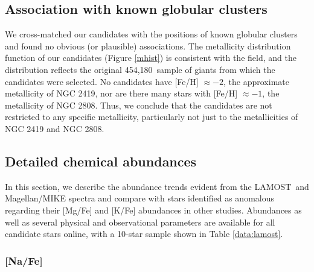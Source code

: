 \documentclass[a4paper,fleqn,usenatbib]{mnras}
\newcommand{\LamostGiants}{454,180}
\newcommand{\project}[1]{#1}
\newcommand{\lamost}{\project{LAMOST}}
\begin{document}
\subsection{Association with known globular clusters}
\label{sec:globclustasoc}
We cross-matched our candidates with the positions of known globular clusters \citep{harris1996} and found no obvious (or plausible) associations. The metallicity distribution function of our candidates (Figure \ref{mhist}) is consistent with the field, and the distribution reflects the original \LamostGiants\ sample of giants from which the candidates were selected.
No candidates have [Fe/H] $\approx -2$, the approximate metallicity of NGC 2419, nor are there many stars with [Fe/H] $\approx -1$, the metallicity of NGC 2808. Thus, we conclude that the candidates are not restricted to any specific metallicity, particularly not just to the metallicities of NGC 2419 and NGC 2808.


\subsection{Detailed chemical abundances}
In this section, we describe the abundance trends evident from the \lamost\ and Magellan/MIKE spectra and compare with stars identified as anomalous regarding their [Mg/Fe] and [K/Fe] abundances in other studies. Abundances as well as several physical and observational parameters are available for all candidate stars online, with a 10-star sample shown in Table \ref{data:lamost}.

\label{sec:abundances}


\subsubsection{[Na/Fe]}
\end{document}
